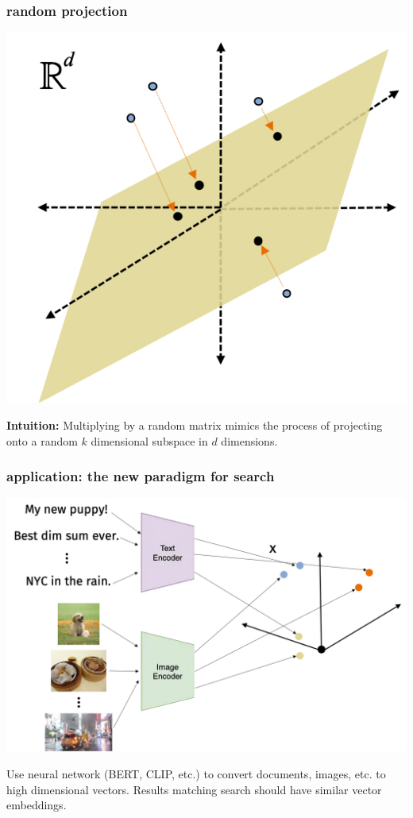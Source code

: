 \documentclass[compress]{beamer}
\begin{document}
\begin{frame}
	\frametitle{random projection}
	\begin{center}
		\includegraphics[width=.6\textwidth]{random_projection.png}
	\end{center}
	\textbf{Intuition:} Multiplying by a random matrix mimics the process of projecting onto a random $k$ dimensional subspace in $d$ dimensions.
\end{frame}


\begin{frame}
	\frametitle{application: the new paradigm for search}
	\begin{center}
				\includegraphics[width=.9\textwidth]{multimodal_embeddings.png}
	\end{center}
	Use neural network (BERT, CLIP, etc.) to convert documents, images, etc. to high dimensional vectors. Results matching search should have similar vector embeddings.
\end{frame}
\end{document}
